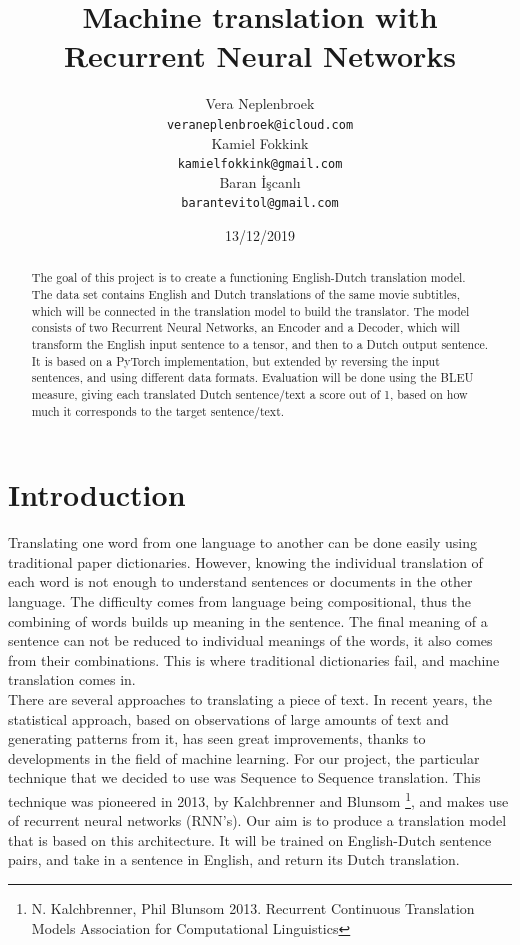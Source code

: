 \documentclass[11pt]{article}
\title{{\LARGE Machine translation with Recurrent Neural Networks}}
\author{Vera Neplenbroek \\
  {\tt veraneplenbroek@icloud.com} \\\And
  Kamiel Fokkink \\
  {\tt kamielfokkink@gmail.com} \\\And
Baran İşcanlı \\
{\tt barantevitol@gmail.com} \\}
\date{13/12/2019}
\begin{document}
\maketitle
\begin{abstract}
  The goal of this project is to create a functioning English-Dutch
  translation model. The data set contains English and Dutch
  translations of the same movie subtitles, which will be connected
  in the translation model to build the translator. The model
  consists of two Recurrent Neural Networks, an Encoder and a Decoder,
  which will transform the English input sentence to a tensor, and
  then to a Dutch output sentence. It is based on a PyTorch
  implementation, but extended by reversing the input sentences, and
  using different data formats. Evaluation will be done using the
  BLEU measure, giving each translated Dutch sentence/text a score
  out of 1, based on how much it corresponds to the target sentence/text.
\end{abstract}

\section{Introduction}

Translating one word from one language to another can be done easily using traditional paper dictionaries. However, knowing the individual translation of each word is not enough to understand sentences or documents in the other language. The difficulty comes from language being compositional, thus the combining of words builds up meaning in the sentence. The final meaning of a sentence can not be reduced to individual meanings of the words, it also comes from their combinations. This is where traditional dictionaries fail, and machine translation comes in.\\

There are several approaches to translating a piece of text. In recent years, the statistical approach, based on observations of large amounts of text and generating patterns from it, has seen great improvements, thanks to developments in the field of machine learning. For our project, the particular technique that we decided to use was Sequence to Sequence translation. This technique was pioneered in 2013, by Kalchbrenner and Blunsom \footnote[1]{N. Kalchbrenner, Phil Blunsom 2013. Recurrent Continuous Translation Models Association for Computational Linguistics}, and makes use of recurrent neural networks (RNN’s). Our aim is to produce a translation model that is based on this architecture. It will be trained on English-Dutch sentence pairs, and take in a sentence in English, and return its Dutch translation.
\end{document}
